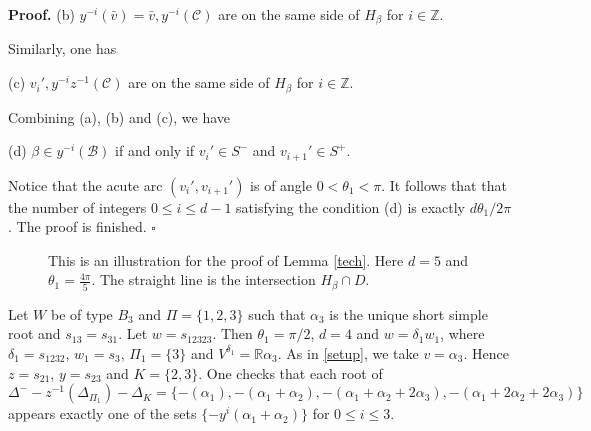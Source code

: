 \documentclass[10pt,leqno]{article}
\newcommand{\qed}{\hfill $\square$ \medskip}
\newenvironment{proof}[1][Proof]{\noindent\textbf{#1.} }{\qed}
\newcommand{\caC}{\mathcal C}
\renewcommand{\a}{\mathfrak a}
\def\le{\leqslant}
\def\a{\alpha}
\def\b{\beta}
\def\d{\delta}
\def\th{\theta}
\def\i{^{-1}}
\begin{document}
\begin{proof}
\noindent(b) $y^{-i}(\bar v)=\bar v, y^{-i}(\caC)$ are on the same side of $H_\b$ for $i \in \mathbb Z$.

Similarly, one has

\noindent(c) $v_i', y^{-i} z^{-1}(\caC)$ are on the same side of $H_\b$ for $i \in \mathbb Z$.

Combining (a), (b) and (c), we have

\noindent(d) $\b \in y^{-i}(\mathcal B)$ if and only if $v_i' \in S^-$ and $v_{i+1}' \in S^+$.

Notice that the acute arc $(v_i', v_{i+1}')$ is of angle $0 < \th_1 < \pi$. It follows that that the number of integers $0 \le i \le d-1$ satisfying the condition (d) is exactly $d\th_1/2\pi$. The proof is finished.
\end{proof}

\begin{figure}
\center
{}

\caption{This is an illustration for the proof of Lemma \ref{tech}. Here $d=5$ and $\th_1 = \frac{4\pi}{5}$. The straight line is the intersection $H_\b \cap D$.}
\end{figure}

\begin{exampleplain}
	Let $W$ be of type $B_3$ and $\Pi=\{1, 2, 3\}$ such that $\a_3$ is the unique short simple root and $s_{13} = s_{31}$. Let $w=s_{12323}$. Then $\th_1 = \pi/2$, $d = 4$ and $w = \d_1 w_1$, where $\d_1 = s_{1232}$, $w_1 = s_3$, $\Pi_1=\{3\}$ and $V^{\d_1} = \mathbb R \a_3$. As in \ref{setup}, we take $v = \a_3$. Hence $z = s_{21}$, $y = s_{23}$ and $K=\{2, 3\}$. One checks that each root of $\Delta^- - z\i(\Delta_{\Pi_1}) - \Delta_K=\{-(\a_1), -(\a_1+\a_2), -(\a_1+\a_2+2 \a_3), -(\a_1+2 \a_2+2 \a_3)\}$ appears exactly one of the sets $\{-y^i(\a_1+\a_2)\}$ for $0 \le i \le 3$.
\end{exampleplain}
\end{document}
